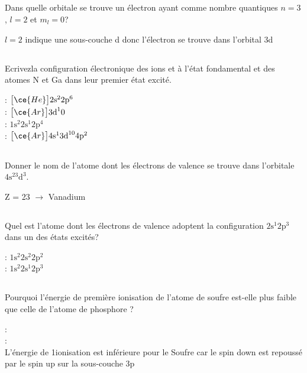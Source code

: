 \subsection{}
Dans quelle orbitale se trouve un électron ayant comme nombre quantiques $n=3$, $l=2$ et $m_l = 0$?
\begin{solution}
	$l=2$ indique une sous-couche d donc l'électron se trouve dans l'orbital 3d
\end{solution}
\subsection{}
Ecrivezla configuration électronique des ions  et  à l'état fondamental et des atomes N et Ga dans leur premier état excité.
\begin{solution}
	: $\big[\ce{He}\big] 2\text{s}^2 2\text{p}^6$\\
	: $\big[\ce{Ar}\big] 3\text{d}^10$\\
	: $1\text{s}^2 2\text{s}^1 2\text{p}^4$ \\
	: $\big[\ce{Ar}\big]4\text{s}^1 3\text{d}^{10} 4\text{p}^2$
\end{solution}
\subsection{}
Donner le nom de l'atome dont les électrons de valence se trouve dans l'orbitale $4\text{s}^23\text{d}^3$.
\begin{solution}
	
	Z = 23 $\rightarrow$ Vanadium
\end{solution}
\subsection{}
Quel est l'atome dont les électrons de valence adoptent la configuration $ 2\text{s}^1 2\text{p}^3$ dans un des états excités?

\begin{solution}
	: $1\text{s}^2 2\text{s}^2 2\text{p}^2$\\
	: $1\text{s}^2 2\text{s}^1 2\text{p}^3$
\end{solution}
\subsection{}

Pourquoi l'énergie de première ionisation de l'atome de soufre est-elle plus faible que celle de l'atome de phosphore ?
\begin{solution}
	:\\
	:\\
	L'énergie de 1\ere ionisation est inférieure pour le Soufre car le spin down est repoussé par le spin up sur la sous-couche 3p
\end{solution}

